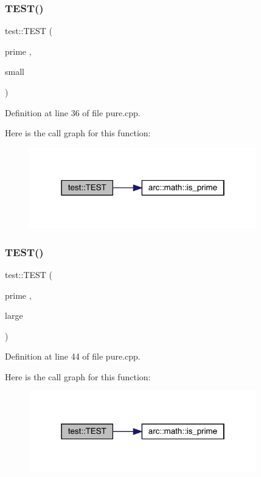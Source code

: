 \subsubsection{\texorpdfstring{TEST()}{TEST()}\hspace{0.1cm}{\footnotesize\ttfamily [2/3]}}
{\footnotesize\ttfamily test\+::\+T\+E\+ST (\begin{DoxyParamCaption}\item[{prime}]{,  }\item[{small}]{ }\end{DoxyParamCaption})}



Definition at line 36 of file pure.\+cpp.

Here is the call graph for this function\+:
\nopagebreak
\begin{figure}[H]
\begin{center}
\leavevmode
\includegraphics[width=280pt]{namespacetest_a1b8e15e415b70d1f246be13c30eec6a3_cgraph}
\end{center}
\end{figure}
\mbox{\label{namespacetest_a9acfb8041dd64550d8e5ba096a077529}} 
\subsubsection{\texorpdfstring{TEST()}{TEST()}\hspace{0.1cm}{\footnotesize\ttfamily [3/3]}}
{\footnotesize\ttfamily test\+::\+T\+E\+ST (\begin{DoxyParamCaption}\item[{prime}]{,  }\item[{large}]{ }\end{DoxyParamCaption})}



Definition at line 44 of file pure.\+cpp.

Here is the call graph for this function\+:
\nopagebreak
\begin{figure}[H]
\begin{center}
\leavevmode
\includegraphics[width=280pt]{namespacetest_a9acfb8041dd64550d8e5ba096a077529_cgraph}
\end{center}
\end{figure}
